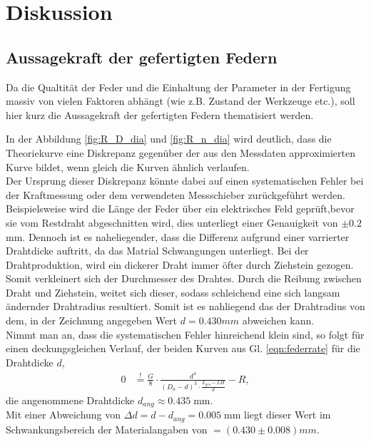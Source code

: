 \newpage
\section{Diskussion}
\subsection{Aussagekraft der gefertigten Federn}
Da die Qualtität der Feder und die Einhaltung der Parameter in der Fertigung 
massiv von vielen Faktoren abhängt (wie z.B. Zustand der Werkzeuge etc.), soll hier kurz
die Aussagekraft der gefertigten Federn thematisiert werden.\newline

In der Abbildung \ref{fig:R_D_dia} und \ref{fig:R_n_dia} wird deutlich, dass die
Theoriekurve eine Diskrepanz gegenüber der aus den Messdaten approximierten 
Kurve bildet, wenn gleich die Kurven ähnlich verlaufen.\\
Der Ursprung dieser Diskrepanz könnte dabei auf einen systematischen Fehler
bei der Kraftmessung oder dem verwendeten Messschieber zurückgeführt werden.\\
Beispielsweise wird die Länge der Feder über ein elektrisches Feld geprüft,bevor sie vom
Restdraht abgeschnitten wird, dies unterliegt einer Genauigkeit von $\pm 0.2$mm. 
Dennoch ist es naheliegender, dass die Differenz
aufgrund einer varrierter Drahtdicke auftritt, da das Matrial Schwangungen unterliegt.
Bei der Drahtproduktion, wird ein dickerer Draht immer öfter durch Ziehstein gezogen.
Somit verkleinert sich der Durchmesser des Drahtes. Durch die Reibung zwischen Draht und Ziehstein, weitet sich
dieser, sodass schleichend eine sich langsam ändernder Drahtradius resultiert. 
Somit ist es nahliegend das der Drahtradius von dem, in der Zeichnung angegeben Wert $d=0.430\si{mm}$ abweichen kann.\\
Nimmt man an, dass die systematischen Fehler hinreichend klein sind, so folgt für einen deckungsgleichen Verlauf, der beiden Kurven aus Gl. \ref{eqn:federrate} für die Drahtdicke $d$,
\begin{align*}
    0&\overset{\text{!}}{=}\frac{G}{8} \cdot \frac{d^4}{(D_a-d)^3\cdot \frac{L_{ges}-LH}{d}}-R,
\end{align*}
die angenommene Drahtdicke $d_{ang} \approx 0.435\;$mm.\\
Mit einer Abweichung von $\Delta d=d-d_{ang}=0.005\;$mm liegt dieser Wert im Schwankungsbereich
der Materialangaben von $=(0.430\pm 0.008)\si{mm}$.


